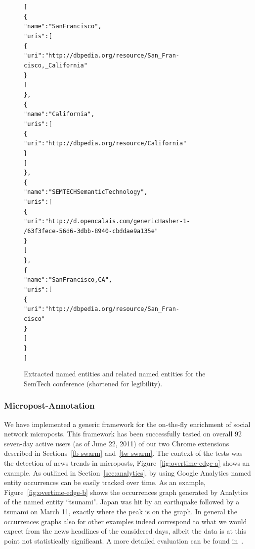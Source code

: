 \documentclass[12pt]{article}
\newenvironment{code}[1]
{\begin{lrbox}{\inverbatim}\begin{minipage}{13.5cm}\begin{alltt}{#1}}
{\end{alltt}\end{minipage}\end{lrbox}\colorbox{lightgray}{\usebox{\inverbatim}}}
\begin{document}
\begin{figure}[htbp!]
\begin{center}
{\footnotesize
\begin{code}
[
    \{
        "name": "San Francisco",
        "uris": [
            \{
                "uri": "http://dbpedia.org/resource/San_Fran-
                        cisco,_California"
            \}
        ]
    \},
    \{
        "name": "California",
        "uris": [
            \{
                "uri": "http://dbpedia.org/resource/California"
            \}
        ]
    \},
    \{
        "name": "SEMTECH Semantic Technology",
        "uris": [
            \{
                "uri": "http://d.opencalais.com/genericHasher-1-
                        /63f3fece-56d6-3dbb-8940-cbddae9a135e"
            \}
        ]
    \},
    \{
        "name": "San Francisco, CA",
        "uris": [
            \{
                "uri": "http://dbpedia.org/resource/San_Fran-
                        cisco"
            \}
        ]
    \}
]
\end{code}}
  \caption[Extracted named entities and related named entities for the SemTech conference.]{Extracted named entities and related named entities for the SemTech conference (shortened for legibility).}
  \label{code:semtech} 
  \end{center}  
\end{figure}

\subsubsection{Micropost-Annotation}
We have implemented a generic framework for the on-the-fly enrichment of social network microposts. This framework has been successfully tested on overall 92 seven-day active users (as of June 22, 2011) of our two Chrome extensions described in Sections~\ref{fb-swarm} and~\ref{tw-swarm}. The context of the tests was the detection of news trends in microposts, Figure~\ref{fig:overtime-edge-a} shows an example. As outlined in Section~\ref{sec:analytics}, by using Google Analytics named entity occurrences can be easily tracked over time. As an example, Figure~\ref{fig:overtime-edge-b} shows the occurrences graph generated by Analytics of the named entity ``tsunami". Japan was hit by an earthquake followed by a tsunami on March 11, exactly where the peak is on the graph. In general the occurrences graphs also for other examples indeed correspond to what we would expect from the news headlines of the considered days, albeit the data is at this point not statistically significant. A more detailed evaluation can be found in~\cite{twittertrends}.
\end{document}
